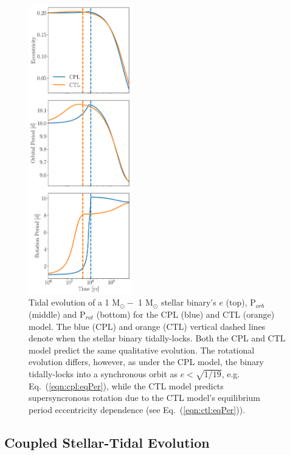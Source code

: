 \documentclass[twocolumn]{aastex61}
\begin{document}
\begin{figure}
	\includegraphics[width=0.4\textwidth]{../Plots/tidalExample.pdf}
   \caption{Tidal evolution of a 1 M$_{\odot} -$ 1 M$_{\odot}$ stellar binary's $e$ (top), P$_{orb}$ (middle) and P$_{rot}$ (bottom) for the CPL (blue) and CTL (orange) model. The blue (CPL) and orange (CTL) vertical dashed lines denote when the stellar binary tidally-locks. Both the CPL and CTL model predict the same qualitative evolution. The rotational evolution differs, however, as under the CPL model, the binary tidally-locks into a synchronous orbit as $e < \sqrt{1/19}$, e.g. Eq.~(\ref{eqn:cpl:eqPer}), while the CTL model predicts supersyncronous rotation due to the CTL model's equilibrium period eccentricity dependence (see Eq.~(\ref{eqn:ctl:eqPer})).}%
    \label{fig:tidalExample}%
\end{figure}

\subsection{Coupled Stellar-Tidal Evolution} \label{sec:coupled}
\end{document}

